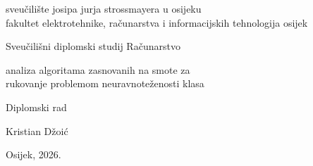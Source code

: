 
\begin{titlepage}

\begin{center}
{\sc\Large sveu\v{c}ili\v{s}te josipa jurja strossmayera u osijeku}\\
{\sc\Large fakultet elektrotehnike, ra\v{c}unarstva i informacijskih tehnologija osijek}\\
\bigskip

\vspace*{2cm}

{\large Sveu\v{c}ili\v{s}ni diplomski studij Ra\v{c}unarstvo}\\

\vspace*{5cm}

{\sc\LARGE analiza algoritama zasnovanih na smote za\\ rukovanje problemom neuravnote\v{z}enosti klasa}

\vspace*{1cm}

{\large Diplomski rad}\\

\vspace*{3cm}

{\Large Kristian D\v{z}oi\'{c}}\\

\vspace*{8cm}

{\normalsize Osijek, 2026.}
\end{center}

\end{titlepage}
